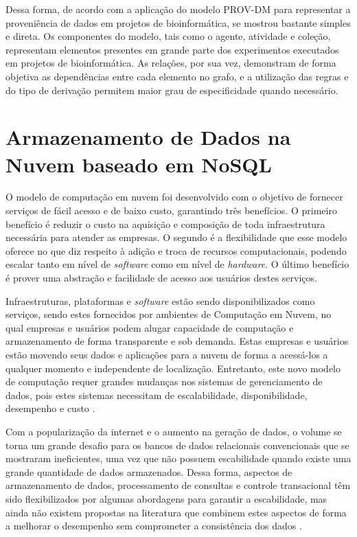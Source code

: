 Dessa forma, de acordo com \cite{renato} a aplicação do modelo PROV-DM para representar a proveniência de dados em projetos de bioinformática, se mostrou bastante simples e direta. Os componentes do modelo, tais como o agente, atividade e coleção, representam elementos presentes em grande parte dos experimentos executados em projetos de bioinformática. As relações, por sua vez, demonstram de forma objetiva as dependências entre cada elemento no grafo, e a utilização das regras e do tipo de derivação permitem maior grau de especificidade quando necessário.

\section{Armazenamento de Dados na Nuvem baseado em NoSQL}

O modelo de computação em nuvem foi desenvolvido com o objetivo de fornecer serviços de fácil acesso e de baixo custo, garantindo três benefícios. O primeiro benefício é reduzir o custo na aquisição e composição de toda infraestrutura necessária para atender as empresas. O segundo é a flexibilidade que esse modelo oferece no que diz respeito à adição e troca de recursos computacionais, podendo escalar tanto em nível de \textit{software} como em nível de \textit{hardware}. O último benefício é prover uma abstração e facilidade de acesso aos usuários destes serviços.

Infraestruturas, plataformas e \textit{software} estão sendo disponibilizados como serviços, sendo estes fornecidos por ambientes de Computação em Nuvem, no qual empresas e usuários podem alugar capacidade de computação e armazenamento de forma transparente e sob demanda. Estas empresas e usuários estão movendo seus dados e aplicações para a nuvem de forma a acessá-los a qualquer momento e independente de localização. Entretanto, este novo modelo de computação requer grandes mudanças nos sistemas de gerenciamento de dados, pois estes sistemas necessitam de escalabilidade, disponibilidade, desempenho e custo \cite{sousa}.

Com a popularização da internet e o aumento na geração de dados, o volume se torna um grande desafio para os bancos de dados relacionais convencionais que se mostraram ineficientes, uma vez que não possuem escabilidade quando existe uma grande quantidade de dados armazenados. Dessa forma, aspectos de armazenamento de dados, processamento de consultas e controle transacional têm sido flexibilizados por algumas abordagens para garantir a escabilidade, mas ainda não existem propostas na literatura que combinem estes aspectos de forma a melhorar o desempenho sem comprometer a consistência dos dados \cite{sousa}.

